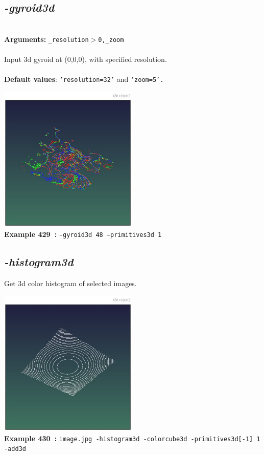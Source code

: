 \documentclass[a4paper,11pt,twoside]{book}
\begin{document}
\subsection{\emph{-gyroid3d} }\vspace*{-0.5em}
~\\\textbf{Arguments: } 
{\small \texttt{\_resolution$>$0,\_zoom}}\\~\\
Input 3d gyroid at (0,0,0), with specified resolution.
~\\~\\\textbf{Default values}: {\small \texttt{'resolution=32'} and \texttt{'zoom=5'.}}
\begin{center}\includegraphics[keepaspectratio=true,height=7cm,width=\textwidth]{img/gmic_def429.jpg}\\
{\footnotesize \textbf{Example 429~:} \texttt{-gyroid3d 48 --primitives3d 1}}
\end{center}

\subsection{\emph{-histogram3d} }\vspace*{-0.5em}
Get 3d color histogram of selected images.
\begin{center}\includegraphics[keepaspectratio=true,height=7cm,width=\textwidth]{img/gmic_def430.jpg}\\
{\footnotesize \textbf{Example 430~:} \texttt{image.jpg -histogram3d -colorcube3d -primitives3d[-1] 1 -add3d}}
\end{center}
\end{document}
